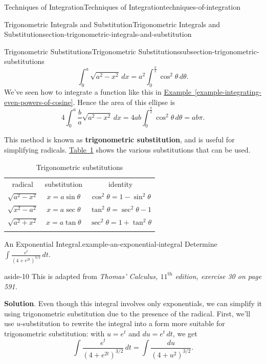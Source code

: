 \documentclass[oneside,10pt,]{book}
\newcommand{\terminology}[1]{\textbf{#1}}
\numberwithin{equation}{section}
\newcommand{\hrulethin}  {\noalign{\hrule height 0.04em}}
\newcommand{\hrulethick} {\noalign{\hrule height 0.11em}}
\begin{document}
\begin{chapterptx}{Techniques of Integration}{}{Techniques of Integration}{}{}{techniques-of-integration}
\begin{sectionptx}{Trigonometric Integrals and Substitution}{}{Trigonometric Integrals and Substitution}{}{}{section-trigonometric-integrals-and-substitution}
\begin{subsectionptx}{Trigonometric Substitutions}{}{Trigonometric Substitutions}{}{}{subsection-trigonometric-substitutions}
\begin{equation*}
\int_{0}^{a}\sqrt{a^{2} - x^{2}}\,dx = a^{2}\int_{0}^{\frac{\pi}{2}}\cos^{2}\theta\,d\theta.
\end{equation*}
We've seen how to integrate a function like this in \hyperref[example-integrating-even-powers-of-cosine]{Example~\ref{example-integrating-even-powers-of-cosine}}. Hence the area of this ellipse is%
\begin{equation*}
4\int_{0}^{a}\frac{b}{a}\sqrt{a^{2} - x^{2}}\,dx = 4ab\int_{0}^{\frac{\pi}{2}}\cos^{2}\theta\,d\theta = ab\pi.
\end{equation*}
%
\par
\hypertarget{p-544}{}%
This method is known as \terminology{trigonometric substitution}, and is useful for simplifying radicals. \hyperref[table-trig-substitutions]{Table~\ref{table-trig-substitutions}} shows the various substitutions that can be used.%
\begin{table}
\centering
\begin{tabular}{ccc}\hrulethick
radical&substitution&identity\tabularnewline\hrulethin
\(\sqrt{a^{2} - x^{2}}\)&\(x = a\sin\theta\)&\(\cos^{2}\theta = 1-\sin^{2}\theta\)\tabularnewline[0pt]
\(\sqrt{x^{2} - a^{2}}\)&\(x = a\sec\theta\)&\(\tan^{2}\theta = \sec^{2}\theta - 1\)\tabularnewline[0pt]
\(\sqrt{a^{2} + x^{2}}\)&\(x = a\tan\theta\)&\(\sec^{2}\theta = 1+\tan^{2}\theta\)\tabularnewline\hrulethick
\end{tabular}
\caption{Trigonometric substitutions\label{table-trig-substitutions}}
\end{table}
\begin{example}{An Exponential Integral.}{example-an-exponential-integral}%
\hypertarget{p-545}{}%
Determine \(\displaystyle\int\frac{e^{t}}{(4 + e^{2t})^{3/2}}\,dt.\)%
\begin{aside}{}{aside-10}%
\hypertarget{p-546}{}%
This is adapted from \emph{Thomas' Calculus, \(11^{\text{th}}\) edition, exercise 30 on page 591.}%
\end{aside}
\par\smallskip%
\noindent\textbf{Solution}.\hypertarget{solution-120}{}\quad%
\hypertarget{p-547}{}%
Even though this integral involves only exponentials, we can simplify it using trigonometric substitution due to the presence of the radical. First, we'll use \(u\)-substitution to rewrite the integral into a form more suitable for trigonometric substitution: with \(u = e^{t}\) and \(du = e^{t}\,dt\), we get%
\begin{equation*}
\int\frac{e^{t}}{(4 + e^{2t})^{3/2}}\,dt = \int\frac{du}{(4 + u^{2})^{3/2}}.

\end{equation*}
\end{example}
\end{subsectionptx}
\end{sectionptx}
\end{chapterptx}
\end{document}
